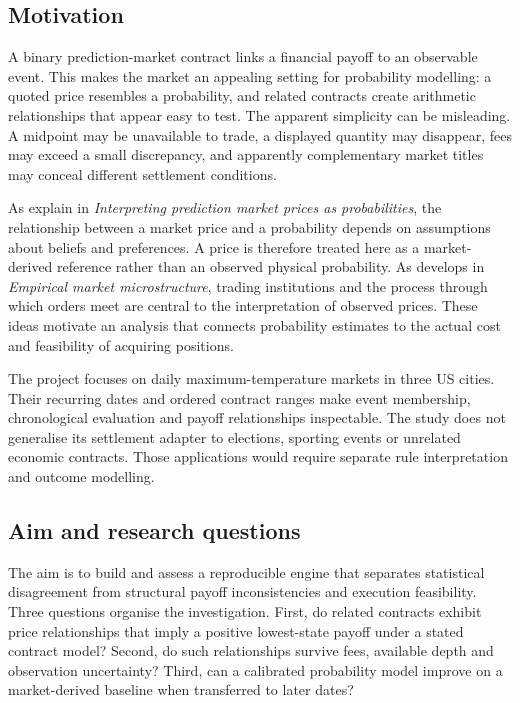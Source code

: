 \label{sec:introduction}
\subsection{Motivation}
A binary prediction-market contract links a financial payoff to an observable event. This makes the market an appealing setting for probability modelling: a quoted price resembles a probability, and related contracts create arithmetic relationships that appear easy to test. The apparent simplicity can be misleading. A midpoint may be unavailable to trade, a displayed quantity may disappear, fees may exceed a small discrepancy, and apparently complementary market titles may conceal different settlement conditions.

As  explain in \textit{Interpreting prediction market prices as probabilities}, the relationship between a market price and a probability depends on assumptions about beliefs and preferences. A price is therefore treated here as a market-derived reference rather than an observed physical probability. As  develops in \textit{Empirical market microstructure}, trading institutions and the process through which orders meet are central to the interpretation of observed prices. These ideas motivate an analysis that connects probability estimates to the actual cost and feasibility of acquiring positions.

The project focuses on daily maximum-temperature markets in three US cities. Their recurring dates and ordered contract ranges make event membership, chronological evaluation and payoff relationships inspectable. The study does not generalise its settlement adapter to elections, sporting events or unrelated economic contracts. Those applications would require separate rule interpretation and outcome modelling.

\subsection{Aim and research questions}
The aim is to build and assess a reproducible engine that separates statistical disagreement from structural payoff inconsistencies and execution feasibility. Three questions organise the investigation. First, do related contracts exhibit price relationships that imply a positive lowest-state payoff under a stated contract model? Second, do such relationships survive fees, available depth and observation uncertainty? Third, can a calibrated probability model improve on a market-derived baseline when transferred to later dates?

